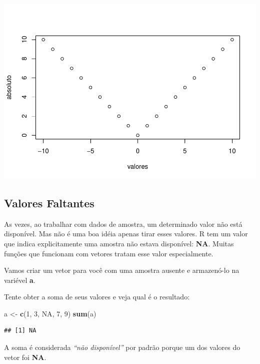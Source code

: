 \documentclass[
]{book}
\newenvironment{Shaded}{\begin{snugshade}}{\end{snugshade}}
\newcommand{\DecValTok}[1]{\textcolor[rgb]{0.00,0.00,0.81}{#1}}
\newcommand{\KeywordTok}[1]{\textcolor[rgb]{0.13,0.29,0.53}{\textbf{#1}}}
\newcommand{\NormalTok}[1]{#1}
\newcommand{\OtherTok}[1]{\textcolor[rgb]{0.56,0.35,0.01}{#1}}
\newcommand{\StringTok}[1]{\textcolor[rgb]{0.31,0.60,0.02}{#1}}
\begin{document}
\includegraphics{TudodoR_files/figure-latex/unnamed-chunk-47-1.pdf}

\hypertarget{valores-faltantes}{%
\subsection{Valores Faltantes}\label{valores-faltantes}}

As vezes, ao trabalhar com dados de amostra, um determinado valor não está disponível. Mas não é uma boa idéia apenas tirar esses valores. R tem um valor que indica explicitamente uma amostra não estava disponível: \textbf{NA}. Muitas funções que funcionam com vetores tratam esse valor especialmente.

Vamos criar um vetor para você com uma amostra ausente e armazenó-lo na variével \textbf{a}.

Tente obter a soma de seus valores e veja qual é o resultado:

\begin{Shaded}
\begin{Highlighting}[]
\NormalTok{a <-}\StringTok{ }\KeywordTok{c}\NormalTok{(}\DecValTok{1}\NormalTok{, }\DecValTok{3}\NormalTok{, }\OtherTok{NA}\NormalTok{, }\DecValTok{7}\NormalTok{, }\DecValTok{9}\NormalTok{)}
\KeywordTok{sum}\NormalTok{(a)}
\end{Highlighting}
\end{Shaded}

\begin{verbatim}
## [1] NA
\end{verbatim}

A soma é considerada \emph{``não disponível''} por padrão porque um dos valores do vetor foi \textbf{NA}.
\end{document}
